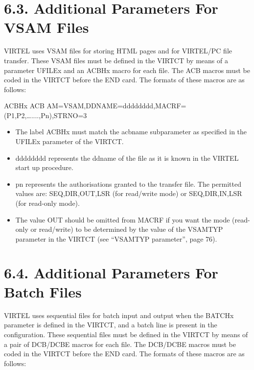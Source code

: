 \documentclass[letterpaper,10pt,english]{sphinxmanual}
\begin{document}
\section{6.3. Additional Parameters For VSAM Files}
\label{\detokenize{Installation_Guide:additional-parameters-for-vsam-files}}
VIRTEL uses VSAM files for storing HTML pages and for VIRTEL/PC file transfer. These VSAM files must be defined in the VIRTCT by means of a parameter UFILEx and an ACBHx macro for each file. The ACB macros must be coded in the VIRTCT before the END card. The formats of these macros are as follows:

\begin{sphinxVerbatim}[commandchars=\\\{\}]
ACBHx ACB AM=VSAM,DDNAME=dddddddd,MACRF=(P1,P2,…....,Pn),STRNO=3
\end{sphinxVerbatim}
\begin{itemize}
\item {} 
The label ACBHx must match the acbname subparameter as specified in the UFILEx parameter of the VIRTCT.

\item {} 
dddddddd represents the ddname of the file as it is known in the VIRTEL start up procedure.

\item {} 
pn represents the authorisations granted to the transfer file. The permitted values are: SEQ,DIR,OUT,LSR (for read/write mode) or SEQ,DIR,IN,LSR (for read-only mode).

\item {} 
The value OUT should be omitted from MACRF if you want the mode (read-only or read/write) to be determined by the value of the VSAMTYP parameter in the VIRTCT (see “VSAMTYP parameter”, page 76).

\end{itemize}


\section{6.4. Additional Parameters For Batch Files}
\label{\detokenize{Installation_Guide:v457ig-bookmark72}}\label{\detokenize{Installation_Guide:additional-parameters-for-batch-files}}
VIRTEL uses sequential files for batch input and output when the BATCHx parameter is defined in the VIRTCT, and a batch line is present in the configuration. These sequential files must be defined in the VIRTCT by means of a pair of DCB/DCBE macros for each file. The DCB/DCBE macros must be coded in the VIRTCT before the END card. The formats of these macros are as follows:
\end{document}
